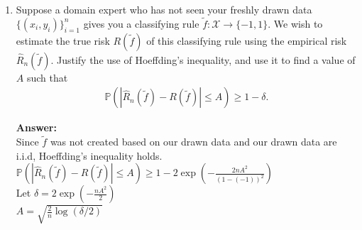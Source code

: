 \documentclass{article}
\newcommand{\1}{\mathbf{1}}
\renewcommand{\P}{\mathbb{P}} %
\begin{document}
\begin{enumerate}
  \item Suppose a domain expert who has not seen your freshly drawn data $\{(x_i,y_i)\}_{i=1}^n$ gives you a classifying rule $\widetilde{f}:\mathcal{X} \rightarrow \{-1,1\}$. We wish to estimate the true risk $R(\widetilde{f})$ of this classifying rule using the empirical risk $\widehat{R}_n(\widetilde{f})$. Justify the use of Hoeffding's inequality, and use it to find a value of $A$ such that
  \begin{align*}
  \P( | \widehat{R}_n(\widetilde{f}) - R(\widetilde{f}) | \leq A ) \geq 1- \delta.
  \end{align*}
  
  \textbf{Answer:}\\
   Since $\widetilde{f}$ was not created based on our drawn data and our drawn data are i.i.d, Hoeffding's inequality holds.\\
   $\P( | \widehat{R}_n(\widetilde{f}) - R(\widetilde{f}) | \leq A ) \geq 1- 2 \exp\left(- \frac{2 n A^2}{(1-(-1))^2}\right)$\\
   Let $\delta=2 \exp\left(- \frac{n A^2}{2}\right)$\\
   $A=\sqrt{\frac{2}{n}\log(\delta/2)} $
  

\end{enumerate}
\end{document}
